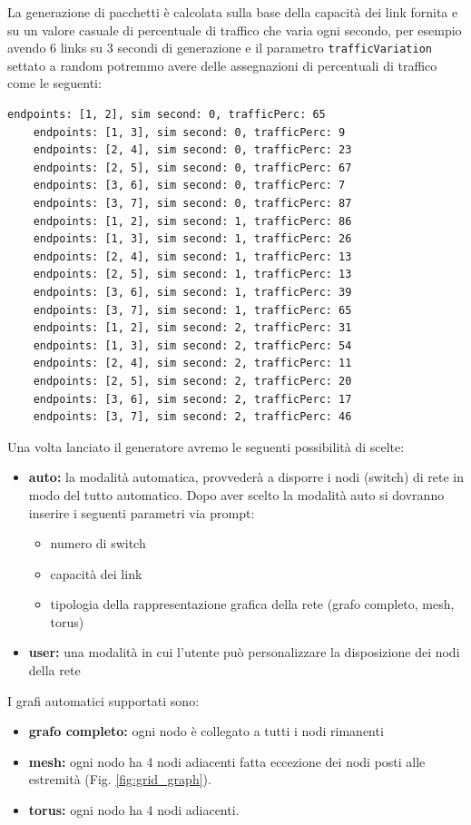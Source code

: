 \documentclass[binding=0.6cm]{sapthesis}
\begin{document}
La generazione di pacchetti è calcolata sulla base 
della capacità dei link fornita e su un valore casuale di percentuale di traffico 
che varia ogni secondo, per esempio avendo 6 links su 3 secondi di generazione e il 
parametro \texttt{trafficVariation} settato a random potremmo avere delle assegnazioni di 
percentuali di traffico come le seguenti:
{\scriptsize %
\begin{lstlisting}[caption={Esempio di variazione traffico casuale}]
    endpoints: [1, 2], sim second: 0, trafficPerc: 65
    endpoints: [1, 3], sim second: 0, trafficPerc: 9
    endpoints: [2, 4], sim second: 0, trafficPerc: 23
    endpoints: [2, 5], sim second: 0, trafficPerc: 67
    endpoints: [3, 6], sim second: 0, trafficPerc: 7
    endpoints: [3, 7], sim second: 0, trafficPerc: 87
    endpoints: [1, 2], sim second: 1, trafficPerc: 86
    endpoints: [1, 3], sim second: 1, trafficPerc: 26
    endpoints: [2, 4], sim second: 1, trafficPerc: 13
    endpoints: [2, 5], sim second: 1, trafficPerc: 13
    endpoints: [3, 6], sim second: 1, trafficPerc: 39
    endpoints: [3, 7], sim second: 1, trafficPerc: 65
    endpoints: [1, 2], sim second: 2, trafficPerc: 31
    endpoints: [1, 3], sim second: 2, trafficPerc: 54
    endpoints: [2, 4], sim second: 2, trafficPerc: 11
    endpoints: [2, 5], sim second: 2, trafficPerc: 20
    endpoints: [3, 6], sim second: 2, trafficPerc: 17
    endpoints: [3, 7], sim second: 2, trafficPerc: 46
\end{lstlisting}
}
Una volta lanciato il generatore avremo le seguenti possibilità di scelte:

\begin{itemize}
    \item \textbf{auto:} la modalità automatica, provvederà a disporre i nodi (switch) di rete in modo del
    tutto automatico. Dopo aver scelto la modalità auto si dovranno inserire i seguenti parametri via prompt:
    \begin{itemize}
        \item numero di switch
        \item capacità dei link
        \item tipologia della rappresentazione grafica della rete (grafo completo, mesh, torus)
    \end{itemize}
    \item \textbf{user:} una modalità in cui l'utente può personalizzare la disposizione dei nodi della rete
\end{itemize}
I grafi automatici supportati sono:
\begin{itemize}
    \item \textbf{grafo completo:} ogni nodo è collegato a tutti i nodi rimanenti \cite{WikiGrafoCompleto}
    \item \textbf{mesh:} ogni nodo ha 4 nodi adiacenti fatta eccezione dei nodi posti alle estremità (Fig. \ref{fig:grid_graph}).
    \item \textbf{torus:} ogni nodo ha 4 nodi adiacenti.
\end{itemize}
\end{document}
